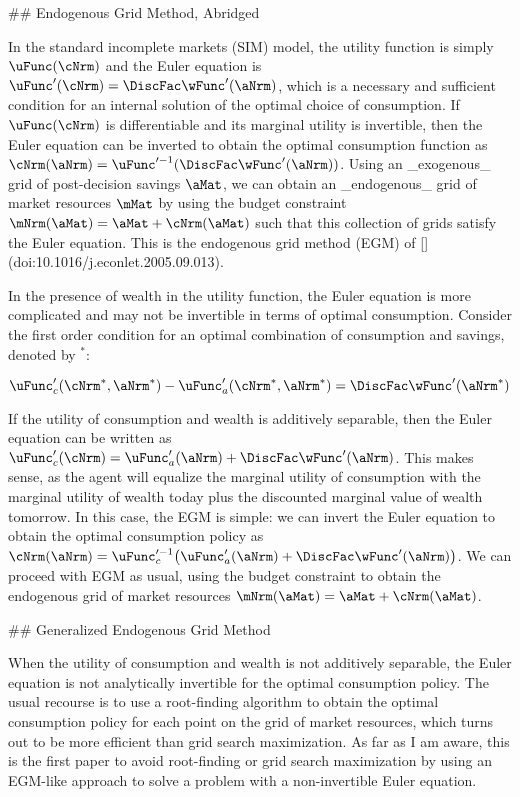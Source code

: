 ## Endogenous Grid Method, Abridged

In the standard incomplete markets (SIM) model, the utility function is simply $\uFunc(\cNrm)$ and the Euler equation is $\uFunc'(\cNrm) = \DiscFac \wFunc'(\aNrm)$, which is a necessary and sufficient condition for an internal solution of the optimal choice of consumption. If $\uFunc(\cNrm)$ is differentiable and its marginal utility is invertible, then the Euler equation can be inverted to obtain the optimal consumption function as $\cNrm(\aNrm) = \uFunc'^{-1}(\DiscFac \wFunc'(\aNrm))$. Using an _exogenous_ grid of post-decision savings $\aMat$, we can obtain an _endogenous_ grid of market resources $\mMat$ by using the budget constraint $\mNrm(\aMat) = \aMat + \cNrm(\aMat)$ such that this collection of grids satisfy the Euler equation. This is the endogenous grid method (EGM) of [](doi:10.1016/j.econlet.2005.09.013).

In the presence of wealth in the utility function, the Euler equation is more complicated and may not be invertible in terms of optimal consumption. Consider the first order condition for an optimal combination of consumption and savings, denoted by $^*$:

\begin{equation}
    \uFunc_{c}'(\cNrm^*, \aNrm^*) - \uFunc_{a}'(\cNrm^*, \aNrm^*) = \DiscFac \wFunc'(\aNrm^*)
\end{equation}

If the utility of consumption and wealth is additively separable, then the Euler equation can be written as $\uFunc_{c}'(\cNrm) = \uFunc_{a}'(\aNrm) + \DiscFac \wFunc'(\aNrm)$. This makes sense, as the agent will equalize the marginal utility of consumption with the marginal utility of wealth today plus the discounted marginal value of wealth tomorrow. In this case, the EGM is simple: we can invert the Euler equation to obtain the optimal consumption policy as $\cNrm(\aNrm) = \uFunc_{c}'^{-1}\big(\uFunc_{a}'(\aNrm) + \DiscFac \wFunc'(\aNrm)\big)$. We can proceed with EGM as usual, using the budget constraint to obtain the endogenous grid of market resources $\mNrm(\aMat) = \aMat + \cNrm(\aMat)$.

## Generalized Endogenous Grid Method

When the utility of consumption and wealth is not additively separable, the Euler equation is not analytically invertible for the optimal consumption policy. The usual recourse is to use a root-finding algorithm to obtain the optimal consumption policy for each point on the grid of market resources, which turns out to be more efficient than grid search maximization. As far as I am aware, this is the first paper to avoid root-finding or grid search maximization by using an EGM-like approach to solve a problem with a non-invertible Euler equation.

